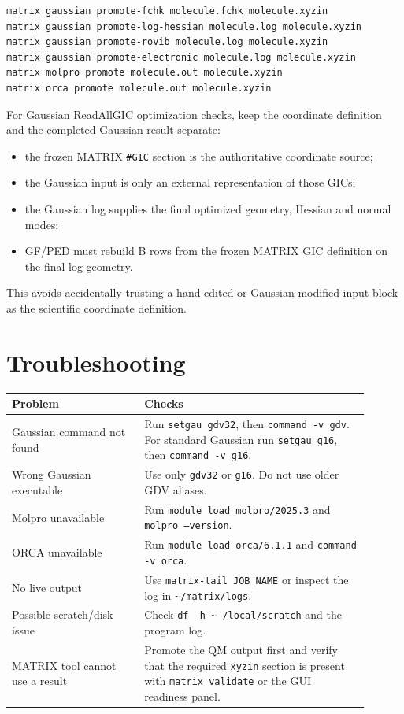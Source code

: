 \documentclass[11pt]{article}
\newcommand{\xyzin}{\texttt{xyzin}}
\begin{document}
\begin{lstlisting}[style=matrix]
matrix gaussian promote-fchk molecule.fchk molecule.xyzin
matrix gaussian promote-log-hessian molecule.log molecule.xyzin
matrix gaussian promote-rovib molecule.log molecule.xyzin
matrix gaussian promote-electronic molecule.log molecule.xyzin
matrix molpro promote molecule.out molecule.xyzin
matrix orca promote molecule.out molecule.xyzin
\end{lstlisting}

For Gaussian ReadAllGIC optimization checks, keep the coordinate definition and
the completed Gaussian result separate:

\begin{itemize}
  \item the frozen MATRIX \texttt{\#GIC} section is the authoritative
        coordinate source;
  \item the Gaussian input is only an external representation of those GICs;
  \item the Gaussian log supplies the final optimized geometry, Hessian and
        normal modes;
  \item GF/PED must rebuild B rows from the frozen MATRIX GIC definition on
        the final log geometry.
\end{itemize}

This avoids accidentally trusting a hand-edited or Gaussian-modified input
block as the scientific coordinate definition.

\section{Troubleshooting}

\begin{longtable}{
  >{\raggedright\arraybackslash}p{0.33\linewidth}
  >{\raggedright\arraybackslash}p{0.57\linewidth}}
\toprule
Problem & Checks \\
\midrule
Gaussian command not found &
Run \texttt{setgau gdv32}, then \texttt{command -v gdv}.  For standard Gaussian
run \texttt{setgau g16}, then \texttt{command -v g16}. \\
Wrong Gaussian executable &
Use only \texttt{gdv32} or \texttt{g16}.  Do not use older GDV aliases. \\
Molpro unavailable &
Run \texttt{module load molpro/2025.3} and \texttt{molpro --version}. \\
ORCA unavailable &
Run \texttt{module load orca/6.1.1} and \texttt{command -v orca}. \\
No live output &
Use \texttt{matrix-tail JOB\_NAME} or inspect the log in
\texttt{\textasciitilde/matrix/logs}. \\
Possible scratch/disk issue &
Check \texttt{df -h \textasciitilde{} /local/scratch} and the program log. \\
MATRIX tool cannot use a result &
Promote the QM output first and verify that the required \xyzin{} section is
present with \texttt{matrix validate} or the GUI readiness panel. \\
\bottomrule
\end{longtable}
\end{document}
